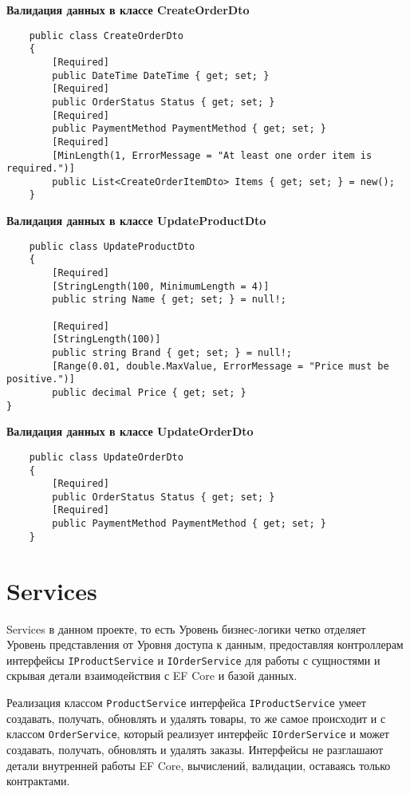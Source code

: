 \documentclass[a4paper,12pt]{report}
\begin{document}
\textbf{Валидация данных в классе CreateOrderDto}
\begin{verbatim}
    public class CreateOrderDto
    {
        [Required]
        public DateTime DateTime { get; set; }
        [Required]
        public OrderStatus Status { get; set; }
        [Required]
        public PaymentMethod PaymentMethod { get; set; }
        [Required]
        [MinLength(1, ErrorMessage = "At least one order item is required.")]
        public List<CreateOrderItemDto> Items { get; set; } = new();
    }
\end{verbatim}

\textbf{Валидация данных в классе UpdateProductDto}
\begin{verbatim}
    public class UpdateProductDto
    {
        [Required]
        [StringLength(100, MinimumLength = 4)]
        public string Name { get; set; } = null!;

        [Required]
        [StringLength(100)]
        public string Brand { get; set; } = null!;
        [Range(0.01, double.MaxValue, ErrorMessage = "Price must be positive.")]
        public decimal Price { get; set; }
}
\end{verbatim}

\textbf{Валидация данных в классе UpdateOrderDto}
\begin{verbatim}
    public class UpdateOrderDto
    {
        [Required]
        public OrderStatus Status { get; set; }
        [Required]
        public PaymentMethod PaymentMethod { get; set; }
    }
\end{verbatim}

\section{Services}

Services в данном проекте, то есть Уровень бизнес-логики четко отделяет Уровень представления от 
Уровня доступа к данным, предоставляя контроллерам интерфейсы \texttt{IProductService} и \texttt{IOrderService} 
для работы с сущностями и скрывая детали взаимодействия с \acs{EF} Core и базой данных.

Реализация классом \texttt{ProductService} интерфейса \texttt{IProductService} 
умеет создавать, получать, обновлять и удалять товары, то же самое происходит 
и с классом \texttt{OrderService}, который реализует интерфейс \texttt{IOrderService} 
и может создавать, получать, обновлять и удалять заказы. Интерфейсы не разглашают 
детали внутренней работы \acs{EF} Core, вычислений, валидации, оставаясь только контрактами.
\end{document}
